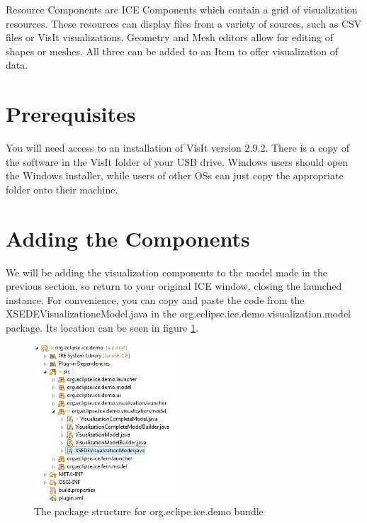 Resource Components are ICE Components which contain a grid of visualization
resources. These resources can display files from a variety of sources,
such as CSV files or VisIt visualizations. Geometry and Mesh editors allow for
editing of shapes or meshes. All three can be added to an Item to offer
visualization of data.

\section{Prerequisites}

You will need access to an installation of VisIt version $2.9.2$. There is a copy of the
software in the VisIt folder of your USB drive. Windows users should open the Windows installer, while users of
other OSs can just copy the appropriate folder onto their machine.

\section{Adding the Components}

We will be adding the visualization components to the model made in the
previous section, so return to your original ICE window, closing the launched
instance. For convenience, you can copy and paste the code from the
XSEDEVisualizationeModel.java in the org.eclipse.ice.demo.visualization.model
package. Its location can be seen in figure \ref{fig:demostructure}.

\begin{figure}[!h]
\includegraphics[width=200]{images/XSEDEDemoPackageStructure}
\centering
\caption{The package structure for org.eclipe.ice.demo bundle}
\label{fig:demostructure}
\end{figure}

